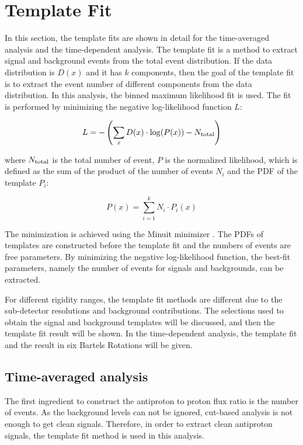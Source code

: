   
\section{Template Fit} \label{TempalteFitSection}

In this section, the template fits are shown in detail for the time-averaged analysis and the time-dependent analysis. The template fit is a method to extract signal and background events from the total event distribution. If the data distribution is $D(x)$ and it has $k$ components, then the goal of the template fit is to extract the event number of different components from the data distribution. In this analysis, the binned maximum likelihood fit is used. The fit is performed by minimizing the negative log-likelihood function $L$:

\begin{equation}
L = - \left ( \sum_{x}^{} D(x) \cdot {\rm{log}}(P(x)) - N_{{\rm{total}}} \right )
\end{equation}

where $N_{\rm{total}}$ is the total number of event, $P$ is the normalized likelihood, which is defined as the sum of the product of the number of events $N_{i}$ and the PDF of the template $P_i$:

\begin{equation}
P(x) = \sum_{i=1}^{k} N_{i} \cdot P_{i}(x)
\end{equation}

The minimization is achieved using the Minuit minimizer \cite{MinuitPaper}. The PDFs of templates are constructed before the template fit and the numbers of events are free parameters. By minimizing the negative log-likelihood function, the best-fit parameters, namely the number of events for signals and backgrounds, can be extracted.  \par

For different rigidity ranges, the template fit methods are different due to the sub-detector resolutions and background contributions. The selections used to obtain the signal and background templates will be discussed, and then the template fit result will be shown. In the time-dependent analysis, the template fit and the result in six Bartels Rotations will be given.   
 
\subsection{Time-averaged analysis}
The first ingredient to construct the antiproton to proton flux ratio is the number of events. As the background levels can not be ignored, cut-based analysis is not enough to get clean signals. Therefore, in order to extract clean antiproton signals, the template fit method is used in this analysis. \par

